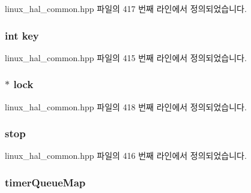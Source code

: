 linux\+\_\+hal\+\_\+common.\+hpp 파일의 417 번째 라인에서 정의되었습니다.

\subsubsection[{\texorpdfstring{key}{key}}]{\setlength{\rightskip}{0pt plus 5cm}int key\hspace{0.3cm}{\ttfamily [private]}}\hypertarget{class_linux_timer_queue_a35af0be900467fedbb610bd6ea65ed78}{}\label{class_linux_timer_queue_a35af0be900467fedbb610bd6ea65ed78}


linux\+\_\+hal\+\_\+common.\+hpp 파일의 415 번째 라인에서 정의되었습니다.

\subsubsection[{\texorpdfstring{lock}{lock}}]{$\ast$ lock\hspace{0.3cm}{\ttfamily [private]}}\hypertarget{class_linux_timer_queue_abdb6f223dacf8c3cf12e918dd48ed210}{}\label{class_linux_timer_queue_abdb6f223dacf8c3cf12e918dd48ed210}


linux\+\_\+hal\+\_\+common.\+hpp 파일의 418 번째 라인에서 정의되었습니다.

\subsubsection[{\texorpdfstring{stop}{stop}}]{ stop\hspace{0.3cm}{\ttfamily [private]}}\hypertarget{class_linux_timer_queue_a53a2d16dac430353052f49aaa0cce34a}{}\label{class_linux_timer_queue_a53a2d16dac430353052f49aaa0cce34a}


linux\+\_\+hal\+\_\+common.\+hpp 파일의 416 번째 라인에서 정의되었습니다.

\subsubsection[{\texorpdfstring{timer\+Queue\+Map}{timerQueueMap}}]{ timer\+Queue\+Map\hspace{0.3cm}{\ttfamily [private]}}\hypertarget{class_linux_timer_queue_a108ec18a8374f47037489ab2d93b73ba}{}\label{class_linux_timer_queue_a108ec18a8374f47037489ab2d93b73ba}


